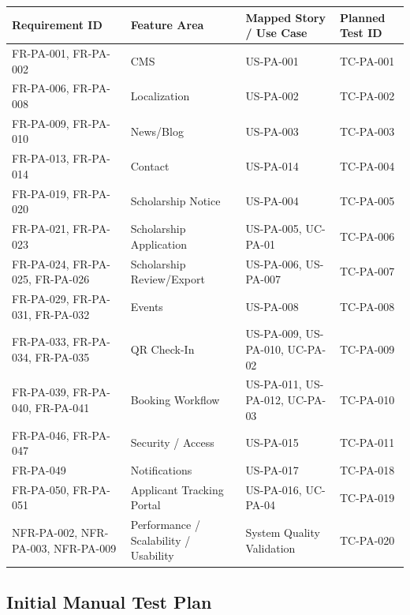 \documentclass[12pt,a4paper]{article}
\newcommand{\thead}[1]{\textbf{\color{white}#1}}
\newcommand{\theadrow}{\rowcolor{headerblue}}
\begin{document}
\begin{longtable}{@{}L{2.4cm}L{3.2cm}L{4cm}L{3.2cm}@{}}
\theadrow \thead{Requirement ID} & \thead{Feature Area} & \thead{Mapped Story / Use Case} & \thead{Planned Test ID} \\
\endhead
FR-PA-001, FR-PA-002 & CMS & US-PA-001 & TC-PA-001 \\
FR-PA-006, FR-PA-008 & Localization & US-PA-002 & TC-PA-002 \\
FR-PA-009, FR-PA-010 & News/Blog & US-PA-003 & TC-PA-003 \\
FR-PA-013, FR-PA-014 & Contact & US-PA-014 & TC-PA-004 \\
FR-PA-019, FR-PA-020 & Scholarship Notice & US-PA-004 & TC-PA-005 \\
FR-PA-021, FR-PA-023 & Scholarship Application & US-PA-005, UC-PA-01 & TC-PA-006 \\
FR-PA-024, FR-PA-025, FR-PA-026 & Scholarship Review/Export & US-PA-006, US-PA-007 & TC-PA-007 \\
FR-PA-029, FR-PA-031, FR-PA-032 & Events & US-PA-008 & TC-PA-008 \\
FR-PA-033, FR-PA-034, FR-PA-035 & QR Check-In & US-PA-009, US-PA-010, UC-PA-02 & TC-PA-009 \\
FR-PA-039, FR-PA-040, FR-PA-041 & Booking Workflow & US-PA-011, US-PA-012, UC-PA-03 & TC-PA-010 \\
FR-PA-046, FR-PA-047 & Security / Access & US-PA-015 & TC-PA-011 \\
FR-PA-049 & Notifications & US-PA-017 & TC-PA-018 \\
FR-PA-050, FR-PA-051 & Applicant Tracking Portal & US-PA-016, UC-PA-04 & TC-PA-019 \\
NFR-PA-002, NFR-PA-003, NFR-PA-009 & Performance / Scalability / Usability & System Quality Validation & TC-PA-020 \\
\bottomrule
\end{longtable}

\subsection{Initial Manual Test Plan}
\end{document}
